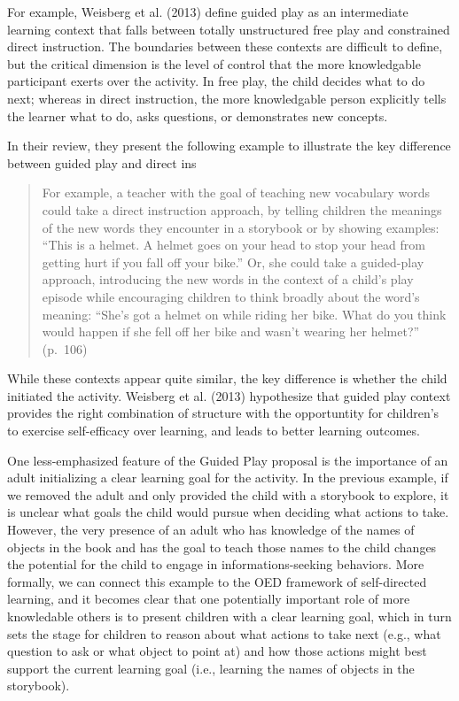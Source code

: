 \documentclass[english,floatsintext,man]{apa6}
\theoremstyle{definition}
\theoremstyle{definition}
\theoremstyle{definition}
\theoremstyle{remark}
\begin{document}
For example, Weisberg et al. (2013) define guided play as an
intermediate learning context that falls between totally unstructured
free play and constrained direct instruction. The boundaries between
these contexts are difficult to define, but the critical dimension is
the level of control that the more knowledgable participant exerts over
the activity. In free play, the child decides what to do next; whereas
in direct instruction, the more knowledgable person explicitly tells the
learner what to do, asks questions, or demonstrates new concepts.

In their review, they present the following example to illustrate the
key difference between guided play and direct ins

\begin{quote}
For example, a teacher with the goal of teaching new vocabulary words
could take a direct instruction approach, by telling children the
meanings of the new words they encounter in a storybook or by showing
examples: \enquote{This is a helmet. A helmet goes on your head to stop
your head from getting hurt if you fall off your bike.} Or, she could
take a guided-play approach, introducing the new words in the context of
a child's play episode while encouraging children to think broadly about
the word's meaning: \enquote{She's got a helmet on while riding her
bike. What do you think would happen if she fell off her bike and wasn't
wearing her helmet?} (p.~106)
\end{quote}

\noindent
While these contexts appear quite similar, the key difference is whether
the child initiated the activity. Weisberg et al. (2013) hypothesize
that guided play context provides the right combination of structure
with the opportuntity for children's to exercise self-efficacy over
learning, and leads to better learning outcomes.

One less-emphasized feature of the Guided Play proposal is the
importance of an adult initializing a clear learning goal for the
activity. In the previous example, if we removed the adult and only
provided the child with a storybook to explore, it is unclear what goals
the child would pursue when deciding what actions to take. However, the
very presence of an adult who has knowledge of the names of objects in
the book and has the goal to teach those names to the child changes the
potential for the child to engage in informations-seeking behaviors.
More formally, we can connect this example to the OED framework of
self-directed learning, and it becomes clear that one potentially
important role of more knowledable others is to present children with a
clear learning goal, which in turn sets the stage for children to reason
about what actions to take next (e.g., what question to ask or what
object to point at) and how those actions might best support the current
learning goal (i.e., learning the names of objects in the storybook).
\end{document}
